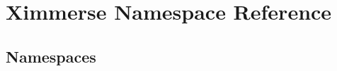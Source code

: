 \hypertarget{namespace_ximmerse}{}\section{Ximmerse Namespace Reference}
\label{namespace_ximmerse}
\subsection*{Namespaces}
\begin{DoxyCompactItemize}
\end{DoxyCompactItemize}
